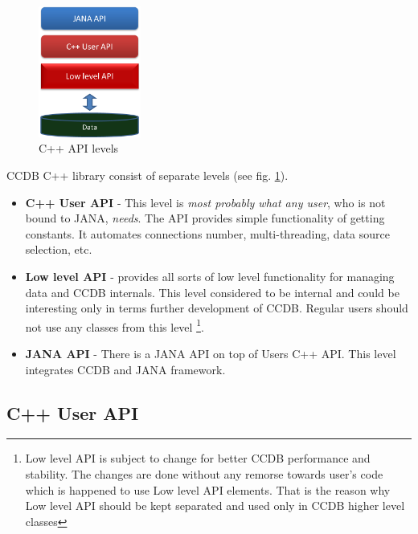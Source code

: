 \documentclass{article}
\begin{document}
\begin{figure}[h]
  \centering
  \includegraphics[width=0.3\textwidth]{pics/cpp_api_levels}
  \caption{C++ API levels}
  \label{pic:cpp_api_levels}
\end{figure}

CCDB C++ library consist of separate levels (see fig. \ref{pic:cpp_api_levels}).
\begin{itemize}
\item \textbf{C++ User API} - This level is \textit{most probably what any user},
      who is not bound to JANA, \textit{needs}. The API provides simple
      functionality of getting  constants. It automates connections number,
      multi-threading, data source selection, etc.

\item \textbf{Low level API} - provides all sorts of low level functionality for
       managing data and CCDB internals. This level considered to be internal
       and could be interesting only in terms further development of CCDB.
       Regular users should not use any classes from this level
       \footnote{Low level API is subject to change for better CCDB performance
                 and stability. The changes are done without any
                 remorse towards user's code which is happened to use Low
                 level API elements. That is the reason why Low level API
                 should be kept separated and used only in CCDB higher level
                 classes}.

\item \textbf{JANA API} - There is a JANA API on top of Users C++ API. This
      level integrates CCDB and JANA framework.
\end{itemize}


\subsection{C++ User API}
\end{document}
